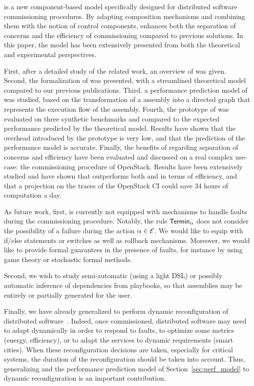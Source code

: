 \mad is a new component-based model specifically designed for
distributed software commissioning procedures. By adapting composition
mechanisms and combining them with the notion of control components,
\mad enhances both the separation of concerns and the efficiency of
commissioning compared to previous solutions. In this paper, the \mad
model has been extensively presented from both the theoretical and
experimental perspectives.

First, after a detailed study of the related work, an overview of \mad
was given. Second, the formalization of \mad was presented, with a
streamlined theoretical model compared to our previous
publications. Third, a performance prediction model of \mad was
studied, based on the transformation of a \mad assembly into a
directed graph that represents the execution flow of the
assembly. Fourth, the prototype of \mad was evaluated on three
synthetic benchmarks and compared to the expected performance
predicted by the theoretical model. Results have shown that the
overhead introduced by the prototype is very low, and that the
prediction of the performance model is accurate. Finally, the benefits
of \mad regarding separation of concerns and efficiency have been
evaluated and discussed on a real complex use-case: the commissioning
procedure of OpenStack. Results have been extensively studied and have
shown that
\mad outperforms both \ansible and \aeolus in terms of efficiency, and that a 
projection on the traces of the OpenStack CI could save 34 hours of computation a 
day.

As future work, first, \mad is currently not equipped with mechanisms to handle faults during the commissioning procedure. Notably, the rule $\mathsf{Termin}_\alpha$
does not consider the possibility of a failure during the action
$\alpha \in \mathcal{E}$. We would like to equip \mad with if/else statements or switches as well as rollback mechanisms. Moreover, we would like to provide formal guarantees in the presence of faults, for instance by using game theory or stochastic formal methods.

Second, we wish to study semi-automatic (\eg using a light DSL) or possibly automatic inference of dependencies from \ansible playbooks, so that \mad assemblies may be entirely or partially generated for the user.

Finally, we have already generalized \mad to perform dynamic reconfiguration of distributed software~\cite{ccgridmaverick}. Indeed, once commissioned, distributed software may need to adapt dynamically in order to respond to faults, to optimize some metrics (\eg energy, efficiency), or to adapt the services to dynamic requirements (\eg smart cities). When these reconfiguration decisions are taken, especially for critical systems, the duration of the reconfiguration should be taken into account. Thus, generalizing \mad and the performance prediction model of Section~\ref{sec:perf_model} to dynamic reconfiguration is an important contribution.

  
